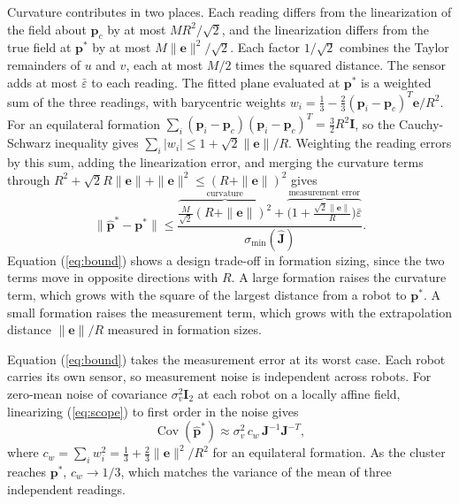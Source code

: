 \documentclass[lettersize,journal]{IEEEtran}
\begin{document}
Curvature contributes in two places. Each reading differs from the linearization of the field about $\mathbf{p}_c$ by at most $MR^2/\sqrt{2}$, and the linearization differs from the true field at $\mathbf{p}^*$ by at most $M\|\mathbf{e}\|^2/\sqrt{2}$. Each factor $1/\sqrt{2}$ combines the Taylor remainders of $u$ and $v$, each at most $M/2$ times the squared distance. The sensor adds at most $\bar{\varepsilon}$ to each reading. The fitted plane evaluated at $\mathbf{p}^*$ is a weighted sum of the three readings, with barycentric weights $w_i = \frac{1}{3} - \frac{2}{3}(\mathbf{p}_i - \mathbf{p}_c)^T\mathbf{e}/R^2$. For an equilateral formation $\sum_i(\mathbf{p}_i - \mathbf{p}_c)(\mathbf{p}_i - \mathbf{p}_c)^T = \tfrac{3}{2}R^2\mathbf{I}$, so the Cauchy-Schwarz inequality gives $\sum_i |w_i| \le 1 + \sqrt{2}\|\mathbf{e}\|/R$. Weighting the reading errors by this sum, adding the linearization error, and merging the curvature terms through $R^2 + \sqrt{2}R\|\mathbf{e}\| + \|\mathbf{e}\|^2 \le (R + \|\mathbf{e}\|)^2$ gives
\begin{equation}\label{eq:bound}
\|\hat{\mathbf{p}}^* - \mathbf{p}^*\| \le \frac{\overbrace{\tfrac{M}{\sqrt{2}}(R + \|\mathbf{e}\|)^2}^{\text{curvature}} + \overbrace{\bigl(1 + \tfrac{\sqrt{2}\|\mathbf{e}\|}{R}\bigr)\bar{\varepsilon}}^{\text{measurement error}}}{\sigma_{\min}(\hat{\mathbf{J}})}.
\end{equation}
Equation (\ref{eq:bound}) shows a design trade-off in formation sizing, since the two terms move in opposite directions with $R$. A large formation raises the curvature term, which grows with the square of the largest distance from a robot to $\mathbf{p}^*$. A small formation raises the measurement term, which grows with the extrapolation distance $\|\mathbf{e}\|/R$ measured in formation sizes.

Equation (\ref{eq:bound}) takes the measurement error at its worst case. Each robot carries its own sensor, so measurement noise is independent across robots. For zero-mean noise of covariance $\sigma_v^2\mathbf{I}_2$ at each robot on a locally affine field, linearizing (\ref{eq:scope}) to first order in the noise gives
\begin{equation}\label{eq:cov}
\operatorname{Cov}(\hat{\mathbf{p}}^*) \approx \sigma_v^2\, c_w\, \mathbf{J}^{-1}\mathbf{J}^{-T},
\end{equation}
where $c_w = \sum_i w_i^2 = \frac{1}{3} + \frac{2}{3}\|\mathbf{e}\|^2/R^2$ for an equilateral formation. As the cluster reaches $\mathbf{p}^*$, $c_w \to 1/3$, which matches the variance of the mean of three independent readings.
\end{document}

